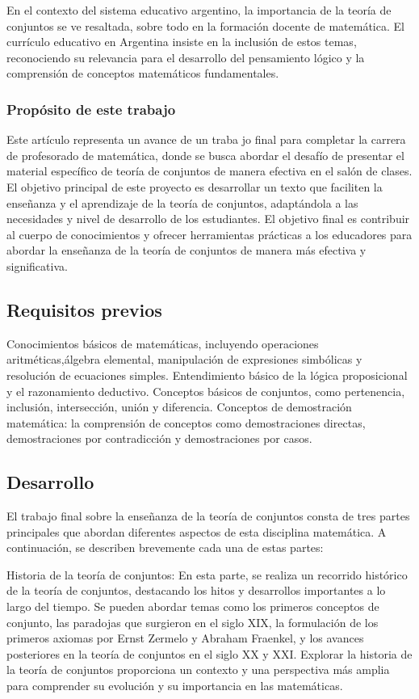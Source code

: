 En el contexto del sistema educativo argentino, la importancia de la teoría de conjuntos se ve resaltada, sobre todo en la formación docente de matemática. El currículo educativo en Argentina insiste en la inclusión de estos temas, reconociendo su relevancia para el desarrollo del pensamiento lógico y la comprensión de conceptos matemáticos fundamentales.

\subsubsection{Propósito de este trabajo}

Este artículo representa un avance de un traba jo final para completar la carrera de profesorado de matemática, donde se busca abordar el desafío de presentar el material específico de teoría de conjuntos de manera efectiva en el salón de clases. El objetivo principal de este proyecto es desarrollar un texto que faciliten la enseñanza y el aprendizaje de la teoría de conjuntos, adaptándola a las necesidades y nivel de desarrollo de los estudiantes. El objetivo final es contribuir al cuerpo de conocimientos y ofrecer herramientas prácticas a los educadores para abordar la enseñanza de la teoría de conjuntos de manera más efectiva y significativa.

\subsection{Requisitos previos}

Conocimientos básicos de matemáticas, incluyendo operaciones aritméticas,álgebra elemental, manipulación de expresiones simbólicas y resolución de ecuaciones simples. Entendimiento básico de la lógica proposicional y el razonamiento deductivo. Conceptos básicos de conjuntos, como pertenencia, inclusión, intersección, unión y diferencia. Conceptos de demostración matemática: la comprensión de conceptos como demostraciones directas, demostraciones por contradicción y demostraciones por casos.

\subsection{Desarrollo}

El trabajo final sobre la enseñanza de la teoría de conjuntos consta de tres partes principales que abordan diferentes aspectos de esta disciplina matemática. A continuación, se describen brevemente cada una de estas partes:

Historia de la teoría de conjuntos: En esta parte, se realiza un recorrido histórico de la teoría de conjuntos, destacando los hitos y desarrollos importantes a lo largo del tiempo. Se pueden abordar temas como los primeros conceptos de conjunto, las paradojas que surgieron en el siglo XIX, la formulación de los primeros axiomas por Ernst Zermelo y Abraham Fraenkel, y los avances posteriores en la teoría de conjuntos en el siglo XX y XXI. Explorar la historia de la teoría de conjuntos proporciona un contexto y una perspectiva más amplia para comprender su evolución y su importancia en las matemáticas.

